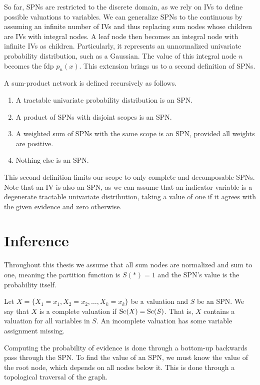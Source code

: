 So far, SPNs are restricted to the discrete domain, as we rely on IVs to define possible valuations
to variables. We can generalize SPNs to the continuous by assuming an infinite number of IVs and
thus replacing sum nodes whose children are IVs with integral nodes. A leaf node then becomes an
integral node with infinite IVs as children. Particularly, it represents an unnormalized
univariate probability distribution, such as a Gaussian. The value of this integral node $n$
becomes the fdp $p_n(x)$. This extension brings us to a second definition of SPNs.

\begin{definition}
  A sum-product network is defined recursively as follows.
  \begin{enumerate}[noitemsep]
    \item A tractable univariate probability distribution is an SPN\@.
    \item A product of SPNs with disjoint scopes is an SPN\@.
    \item A weighted sum of SPNs with the same scope is an SPN, provided all weights are positive.
    \item Nothing else is an SPN\@.
  \end{enumerate}
\end{definition}

This second definition limits our scope to only complete and decomposable SPNs. Note that an IV is
also an SPN, as we can assume that an indicator variable is a degenerate tractable univariate
distribution, taking a value of one if it agrees with the given evidence and zero otherwise.

\section{Inference}

Throughout this thesis we assume that all sum nodes are normalized and sum to one, meaning the
partition function is $S(\ast)=1$ and the SPN's value is the probability itself.

Let $X=\{X_1=x_1,X_2=x_2,\ldots,X_k=x_k\}$ be a valuation and $S$ be an SPN\@. We say that $X$ is a
complete valuation if $\operatorname*{\text{Sc}}(X)=\operatorname*{\text{Sc}}(S)$. That is, $X$ contains a valuation for all variables in $S$.
An incomplete valuation has some variable assignment missing.

Computing the probability of evidence is done through a bottom-up backwards pass through the SPN\@.
To find the value of an SPN, we must know the value of the root node, which depends on all nodes
below it. This is done through a topological traversal of the graph.

